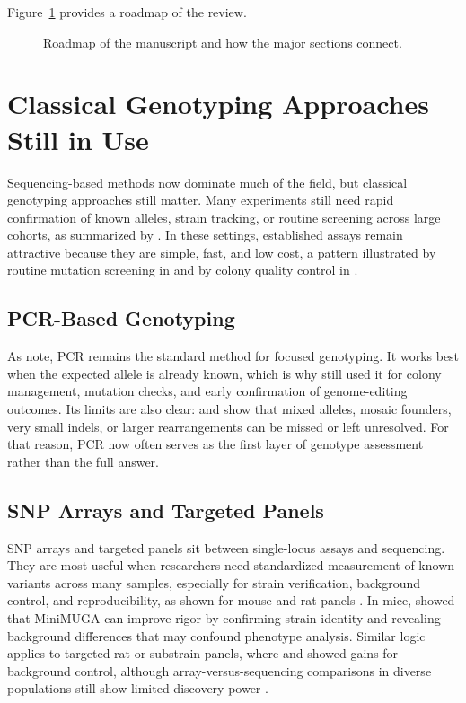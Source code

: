 \documentclass{article}
\begin{document}
Figure~\ref{fig:paper-flow} provides a roadmap of the review.
\begin{figure}[t]
  \centering
  
  \caption{Roadmap of the manuscript and how the major sections connect.}
  \label{fig:paper-flow}
\end{figure}

\section{Classical Genotyping Approaches Still in Use}
Sequencing-based methods now dominate much of the field, but classical genotyping approaches still matter. Many experiments still need rapid confirmation of known alleles, strain tracking, or routine screening across large cohorts, as summarized by \textcite{kockum2023overview}. In these settings, established assays remain attractive because they are simple, fast, and low cost, a pattern illustrated by routine mutation screening in \textcite{zheng2022simple} and by colony quality control in \textcite{sigmon2020content}.

\subsection{PCR-Based Genotyping}
As \textcite{limaye2023genotyping} note, PCR remains the standard method for focused genotyping. It works best when the expected allele is already known, which is why \textcite{byambaa2020generation} still used it for colony management, mutation checks, and early confirmation of genome-editing outcomes. Its limits are also clear: \textcite{carrington2022comprehensive} and \textcite{zheng2022simple} show that mixed alleles, mosaic founders, very small indels, or larger rearrangements can be missed or left unresolved. For that reason, PCR now often serves as the first layer of genotype assessment rather than the full answer.

\subsection{SNP Arrays and Targeted Panels}
SNP arrays and targeted panels sit between single-locus assays and sequencing. They are most useful when researchers need standardized measurement of known variants across many samples, especially for strain verification, background control, and reproducibility, as shown for mouse and rat panels \parencite{sigmon2020content,lu2024identification}. In mice, \textcite{sigmon2020content} showed that MiniMUGA can improve rigor by confirming strain identity and revealing background differences that may confound phenotype analysis. Similar logic applies to targeted rat or substrain panels, where \textcite{miura2022characterization} and \textcite{lu2024identification} showed gains for background control, although array-versus-sequencing comparisons in diverse populations still show limited discovery power \parencite{chat2022ultra,deng2022comparison}.
\end{document}
